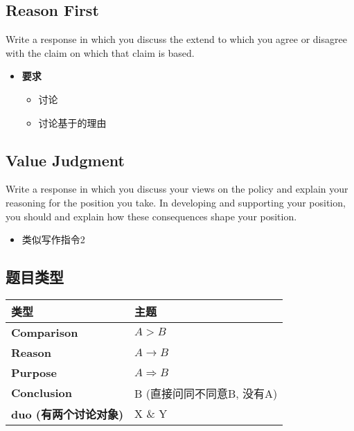   \subsection{Reason First}

    Write a response in which you discuss the extend to which you agree or
    disagree with the claim  on which that claim
    is based.

    \begin{itemize}
      \item \textbf{要求}
      \begin{itemize}
        \item 讨论
        \item 讨论基于的理由
      \end{itemize}
    \end{itemize}

  \subsection{Value Judgment}

    Write a response in which you discuss your views on the policy and
    explain your reasoning for the position you take. In developing and
    supporting your position, you should  and explain how these
    consequences shape your position.

    \begin{itemize}
      \item 类似写作指令2
    \end{itemize}

  \subsection{题目类型}

    \begin{tabu} to \columnwidth{| X[1, c] | X[1, c] |}
      \hline
      \textbf{类型} & \textbf{主题} \\ \hline
      \textbf{Comparison} & $ A > B $ \\ \hline
      \textbf{Reason} & $ A \rightarrow B $ \\ \hline
      \textbf{Purpose} & $ A \Rightarrow B $ \\ \hline
      \textbf{Conclusion} & B (直接问同不同意B, 没有A) \\ \hline
      \textbf{duo (有两个讨论对象)} & X \& Y \\ \hline
    \end{tabu}
